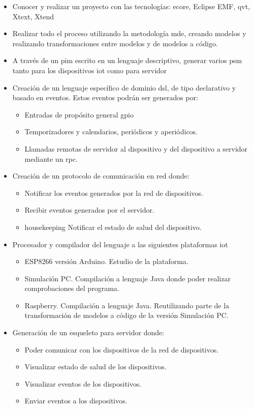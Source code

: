 \begin{itemize}
	\item Conocer y realizar un proyecto con las tecnologías: \gls{ecore}, Eclipse EMF, \gls{qvt}, Xtext, Xtend
	\item Realizar todo el proceso utilizando la metodología \gls{mde}, creando modelos y realizando transformaciones entre modelos y de modelos a código.
	\item A través de un \gls{pim} escrito en un lenguaje descriptivo, generar varios \gls{psm} tanto para los dispositivos \gls{iot} como para servidor

	\item Creación de un lenguaje específico de dominio \gls{dsl}, de tipo declarativo y basado en eventos. Estos eventos podrán ser generados por:
	\begin{itemize}
    	\item Entradas de propósito general \gls{gpio}
    	\item Temporizadores y calendarios, periódicos y aperiódicos.
    	\item Llamadas remotas de servidor al dispositivo y del dispositivo a servidor mediante un \gls{rpc}.
	\end{itemize}

\item Creación de un protocolo de comunicación en red donde:
	\begin{itemize}
    	\item Notificar los eventos generados por la red de dispositivos.
    	\item Recibir eventos generados por el servidor.
    	\item \gls{housekeeping} Notificar el estado de salud del dispositivo.
	\end{itemize}

\item Procesador y compilador del lenguaje a las siguientes plataformas \gls{iot}
	\begin{itemize}
    	\item ESP8266 versión Arduino. Estudio de la plataforma.
    	\item Simulación PC. Compilación a lenguaje Java donde poder realizar comprobaciones del programa.
    	\item Raspberry. Compilación a lenguaje Java. Reutilizando parte de la transformación de modelos a código de la versión Simulación PC. 
	\end{itemize}

\item Generación de un esqueleto para servidor donde:
	\begin{itemize}
    	\item Poder comunicar con los dispositivos de la red de dispositivos.
    	\item Visualizar estado de salud de los dispositivos.
    	\item Visualizar eventos de los dispositivos.
    	\item Enviar eventos a los dispositivos.
	\end{itemize}
	
\end{itemize}


